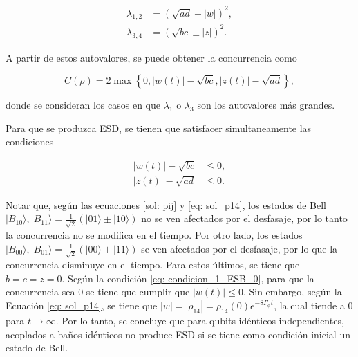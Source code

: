 \begin{align}
    \lambda_{1, 2} &= \left(\sqrt{ad} \pm |w|\right)^2, \label{eq: eigval_12} \\
    \lambda_{3, 4} &= \left(\sqrt{bc} \pm |z|\right)^2 \label{eq: eigval_34}.
\end{align}

A partir de estos autovalores, se puede obtener la concurrencia como

\begin{equation}    \label{eq: concurrencia_two_qubits}
    C(\rho) = 2 \max \left\{0, |w(t)| - \sqrt{bc}, |z(t)| - \sqrt{ad}\right\},
\end{equation}

\noindent donde se consideran los casos en que \(\lambda_1\) o \(\lambda_3\) son los autovalores más grandes.

Para que se produzca ESD, se tienen que satisfacer simultaneamente las condiciones \cite{ESD}

\begin{align}
    |w(t)| - \sqrt{bc} &\leq 0, \label{eq: condicion_1_ESB_0} \\
    |z(t)| - \sqrt{ad} &\leq 0. \label{eq: condicion_2_ESB_0}
\end{align}

Notar que, según las ecuaciones \ref{sol: pij} y \ref{eq: sol_p14}, los estados de Bell \(|B_{10}\rangle, |B_{11}\rangle = \frac{1}{\sqrt{2}} (|01\rangle \pm |10\rangle)\) no se ven afectados por el desfasaje, por lo tanto la concurrencia no se modifica en el tiempo. Por otro lado, los estados \(|B_{00}\rangle, |B_{01}\rangle = \frac{1}{\sqrt{2}} (|00\rangle \pm |11\rangle)\) se ven afectados por el desfasaje, por lo que la concurrencia disminuye en el tiempo. Para estos últimos, se tiene que \(b = c = z = 0\). Según la condición \ref{eq: condicion_1_ESB_0}, para que la concurrencia sea 0 se tiene que cumplir que \(|w(t)| \leq 0\). Sin embargo, según la Ecuación \ref{eq: sol_p14}, se tiene que \(|w| = |\rho_{14}| = \rho_{14}(0) e^{-8 \Gamma_\phi t}\), la cual tiende a 0 para \(t \rightarrow \infty\). Por lo tanto, se concluye que para qubits idénticos independientes, acoplados a baños idénticos no produce ESD si se tiene como condición inicial un estado de Bell.




